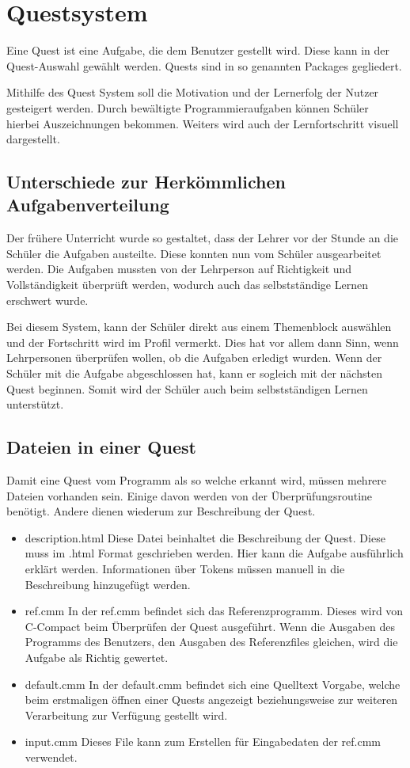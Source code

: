 \chapter{Questsystem}
Eine Quest ist eine Aufgabe, die dem Benutzer gestellt wird. Diese kann in der Quest-Auswahl gewählt werden. Quests sind in so genannten Packages gegliedert. 

Mithilfe des Quest System soll die Motivation und der Lernerfolg der Nutzer gesteigert werden. Durch bewältigte Programmieraufgaben können Schüler hierbei Auszeichnungen bekommen. Weiters wird auch der Lernfortschritt visuell dargestellt.


\section{Unterschiede zur Herkömmlichen Aufgabenverteilung}
Der frühere Unterricht wurde so gestaltet, dass der Lehrer vor der Stunde an die Schüler die Aufgaben austeilte. Diese konnten nun vom Schüler ausgearbeitet werden. Die Aufgaben mussten von der Lehrperson auf Richtigkeit und Vollständigkeit überprüft werden, wodurch auch das selbstständige Lernen erschwert wurde.

Bei diesem System, kann der Schüler direkt aus einem Themenblock auswählen und der Fortschritt wird im Profil vermerkt. Dies hat vor allem dann Sinn, wenn Lehrpersonen überprüfen wollen, ob die Aufgaben erledigt wurden. Wenn der Schüler mit die Aufgabe abgeschlossen hat, kann er sogleich mit der nächsten Quest beginnen. Somit wird der Schüler auch beim selbstständigen Lernen unterstützt.

\section{Dateien in einer Quest}
Damit eine Quest vom Programm als so welche erkannt wird, müssen mehrere Dateien vorhanden sein. Einige davon werden von der Überprüfungsroutine benötigt. Andere dienen wiederum zur Beschreibung der Quest.

\begin{itemize}
\item description.html
Diese Datei beinhaltet die Beschreibung der Quest. Diese muss im .html Format geschrieben werden. Hier kann die Aufgabe ausführlich erklärt werden. Informationen über Tokens müssen manuell in die Beschreibung hinzugefügt werden.

\item ref.cmm
In der ref.cmm befindet sich das Referenzprogramm. Dieses wird von C-Compact beim Überprüfen der Quest ausgeführt. Wenn die Ausgaben des Programms des Benutzers, den Ausgaben des Referenzfiles gleichen, wird die Aufgabe als Richtig gewertet.

\item default.cmm
In der default.cmm befindet sich eine Quelltext Vorgabe, welche beim erstmaligen öffnen einer Quests angezeigt beziehungsweise zur weiteren Verarbeitung zur Verfügung gestellt wird.

\item input.cmm
Dieses File kann zum Erstellen für Eingabedaten der ref.cmm verwendet.
\end{itemize}

